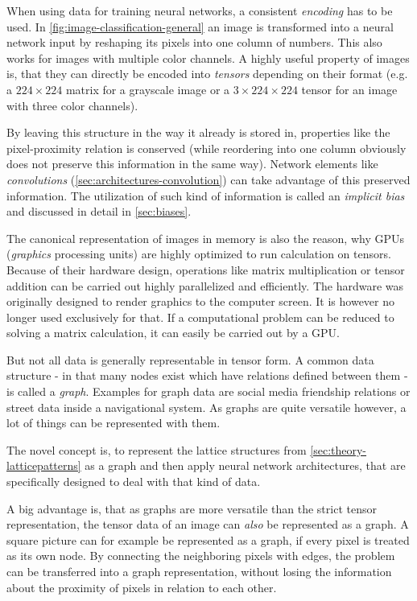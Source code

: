 When using data for training neural networks, a consistent \emph{encoding} has to be used.
In \autoref{fig:image-classification-general} an image is transformed into a neural network input by reshaping its pixels into one column of numbers. This also works for images with multiple color channels.
A highly useful property of images is, that they can directly be encoded into \emph{tensors} depending on their format (e.g. a $224\times224$ matrix for a grayscale image or a $3\times224\times224$ tensor for an image with three color channels).

By leaving this structure in the way it already is stored in, properties like the pixel-proximity relation is conserved (while reordering into one column obviously does not preserve this information in the same way).
Network elements like \emph{convolutions} (\autoref{sec:architectures-convolution}) can take advantage of this preserved information. 
The utilization of such kind of information is called an \emph{implicit bias} and discussed in detail in \autoref{sec:biases}.

The canonical representation of images in memory is also the reason, why GPUs (\emph{graphics} processing units) are highly optimized to run calculation on tensors.
Because of their hardware design, operations like matrix multiplication or tensor addition can be carried out highly parallelized and efficiently.
The hardware was originally designed to render graphics to the computer screen. 
It is however no longer used exclusively for that.
If a computational problem can be reduced to solving a matrix calculation, it can easily be carried out by a GPU.

But not all data is generally representable in tensor form. A common data structure - in that many nodes exist which have relations defined between them - is called a \emph{graph}.
Examples for graph data are social media friendship relations or street data inside a navigational system.
As graphs are quite versatile however, a lot of things can be represented with them.

The novel concept is, to represent the lattice structures from \autoref{sec:theory-latticepatterns} as a graph and then apply neural network architectures, that are specifically designed to deal with that kind of data.

A big advantage is, that as graphs are more versatile than the strict tensor representation, the tensor data of an image can \emph{also} be represented as a graph. 
A square picture can for example be represented as a graph, if every pixel is treated as its own node. 
By connecting the neighboring pixels with edges, the problem can be transferred into a graph representation, without losing the information about the proximity of pixels in relation to each other.


